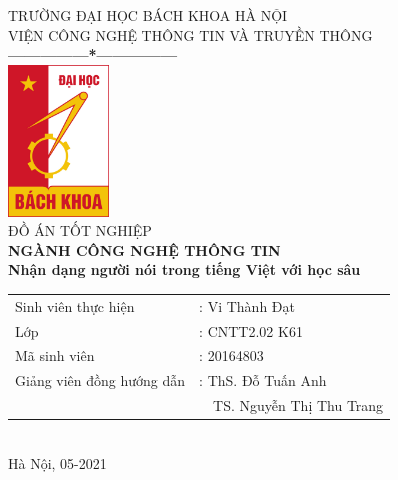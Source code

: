 \documentclass[a4paper, 13pt, oneside]{report}
\begin{document}

\begin{spacing}{1.25}
    \thispagestyle{empty}
    \thisfancypage{\setlength{\fboxrule}{1pt}\doublebox}{}
    \begin{center}
        {\fontsize{17}{20}\selectfont TRƯỜNG ĐẠI HỌC BÁCH KHOA HÀ NỘI} \\
        {\fontsize{13}{17}\selectfont VIỆN CÔNG NGHỆ THÔNG TIN VÀ TRUYỀN THÔNG} \\ [0.25cm]
        \textbf{---------------*---------------} \\ [1cm]
        \includegraphics[width=0.2\textwidth]{hust.jpeg} \\ [1cm]
        {\fontsize{23}{28}\selectfont ĐỒ ÁN TỐT NGHIỆP} \\ [0.25cm]
        {\fontsize{23}{28}\selectfont \textbf{NGÀNH CÔNG NGHỆ THÔNG TIN}} \\ [2.5cm]
        {\fontsize{15}{15}\selectfont \textbf{Nhận dạng người nói trong tiếng Việt với học sâu}} \\ [2.25cm]
        \begin{tabular}{ l l }
            Sinh viên thực hiện & : Vi Thành Đạt \\
            Lớp & : CNTT2.02 K61 \\
            Mã sinh viên & : 20164803 \\ [0.5cm]
            Giảng viên đồng hướng dẫn   & : ThS. Đỗ Tuấn Anh \\
                                        &\ \ TS. Nguyễn Thị Thu Trang
        \end{tabular} \\ [2.25cm]
        {\fontsize{17}{20}\selectfont Hà Nội, 05-2021}
    \end{center}
\end{spacing}
\pagebreak
\end{document}
